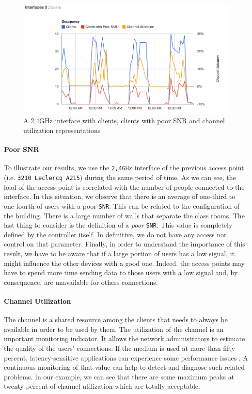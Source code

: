\begin{figure}[H]
   \includegraphics[width=\textwidth]{Pictures/chapter5/interfaceLoad.png}
   \caption{A 2,4GHz interface with clients, clients with poor SNR and channel utilization representations}
\end{figure}

\paragraph*{Poor SNR} To illustrate our results, we use the \texttt{2,4GHz} interface of the previous access point (i.e. \texttt{3210 Leclercq A215}) during the same period of time. As we can see, the load of the access point is correlated with the number of people connected to the interface. In this situation, we observe that there is an average of one-third to one-fourth of users with a poor \texttt{SNR}. This can be related to the configuration of the building. There is a large number of walls that separate the class rooms. The last thing to consider is the definition of a \emph{poor} \texttt{SNR}. This value is completely defined by the controller itself. In definitive, we do not have any access nor control on that parameter. Finally, in order to understand the importance of this result, we have to be aware that if a large portion of users has a low signal, it might influence the other devices with a good one. Indeed, the access points may have to spend more time sending data to those users with a low signal and, by consequence, are unavailable for others connections.

\paragraph*{Channel Utilization} The channel is a shared resource among the clients that needs to always be available in order to be used by them. The utilization of the channel is an important monitoring indicator. It allows the network administrators to estimate the quality of the users' connections. If the medium is used at more than fifty percent, latency-sensitive applications can experience some performance issues \cite{ciscoVowlan}. A continuous monitoring of that value can help to detect and diagnose such related problems. In our example, we can see that there are some maximum peaks at twenty percent of channel utilization which are totally acceptable. 


